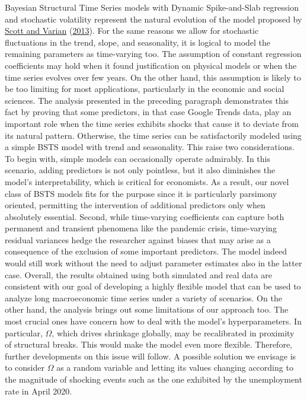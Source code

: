 \documentclass[
  12pt,
]{book}
\theoremstyle{break}
\theoremstyle{nonumberplain}
\begin{document}
Bayesian Structural Time Series models with Dynamic Spike-and-Slab
regression and stochastic volatility represent the natural evolution of
the model proposed by \protect\hyperlink{ref-scott_varian_2013}{Scott
and Varian} (\protect\hyperlink{ref-scott_varian_2013}{2013}). For the
same reasons we allow for stochastic fluctuations in the trend, slope,
and seasonality, it is logical to model the remaining parameters as
time-varying too. The assumption of constant regression coefficients may
hold when it found justification on physical models or when the time
series evolves over few years. On the other hand, this assumption is
likely to be too limiting for most applications, particularly in the
economic and social sciences. The analysis presented in the preceding
paragraph demonstrates this fact by proving that some predictors, in
that case Google Trends data, play an important role when the time
series exhibits shocks that cause it to deviate from its natural
pattern. Otherwise, the time series can be satisfactorily modeled using
a simple BSTS model with trend and seasonality. This raise two
considerations. To begin with, simple models can occasionally operate
admirably. In this scenario, adding predictors is not only pointless,
but it also diminishes the model's interpretability, which is critical
for economists. As a result, our novel class of BSTS models fits for the
purpose since it is particularly parsimony oriented, permitting the
intervention of additional predictors only when absolutely essential.
Second, while time-varying coefficients can capture both permanent and
transient phenomena like the pandemic crisis, time-varying residual
variances hedge the researcher against biases that may arise as a
consequence of the exclusion of some important predictors. The model
indeed would still work without the need to adjust parameter estimates
also in the latter case. Overall, the results obtained using both
simulated and real data are consistent with our goal of developing a
highly flexible model that can be used to analyze long macroeconomic
time series under a variety of scenarios. On the other hand, the
analysis brings out some limitations of our approach too. The most
crucial ones have concern how to deal with the model's hyperparameters.
In particular, \(\Omega\), which drives shrinkage globally, may be
recalibrated in proximity of structural breaks. This would make the
model even more flexible. Therefore, further developments on this issue
will follow. A possible solution we envisage is to consider \(\Omega\)
as a random variable and letting its values changing according to the
magnitude of shocking events such as the one exhibited by the
unemployment rate in April 2020.
\end{document}
